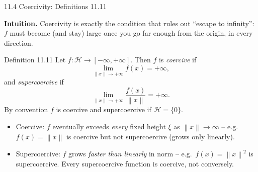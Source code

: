 \documentclass[aspectratio=169,10pt]{beamer}
\newcommand{\mHH}{\mathcal H}
\newcommand{\norm}[1]{\left\|#1\right\|}
\begin{document}
\begin{frame}{11.4 Coercivity: Definitions 11.11}

  \textbf{Intuition.} Coercivity is exactly the condition that rules
  out ``escape to infinity'': $f$ must become (and stay) large once
  you go far enough from the origin, in every direction.

  \begin{block}{Definition 11.11}
    Let $f:\mHH\to[-\infty,+\infty]$. Then $f$ is \emph{coercive} if
    \[
      \lim_{\norm{x}\to+\infty}f(x)=+\infty,
    \]
    and \emph{supercoercive} if
    \[
      \lim_{\norm{x}\to+\infty}\frac{f(x)}{\norm{x}}=+\infty.
    \]
    By convention $f$ is coercive and supercoercive if $\mHH=\{0\}$.
  \end{block}

  \begin{itemize}
    \item Coercive: $f$ eventually exceeds \emph{every} fixed height
          $\xi$ as $\norm{x}\to\infty$ -- e.g.\ $f(x)=\norm{x}$ is
          coercive but not supercoercive (grows only linearly).
    \item Supercoercive: $f$ grows \emph{faster than linearly} in
          norm -- e.g.\ $f(x)=\norm{x}^2$ is supercoercive. Every
          supercoercive function is coercive, not conversely.
  \end{itemize}

\end{frame}
\end{document}
